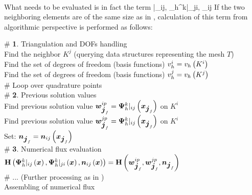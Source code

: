 \paragraph{}
What needs to be evaluated is in fact the term
\be
\mrH{}|_{ij}\lo\bfx\ro, {\mrPsi_h^{k}}|_{ji}\lo\bfx\ro, \bfn_{ij}\lo\bfx\ro\ro
\ee
If the two neighboring elements are of the same size as in , calculation of this term from algorithmic perspective is performed as follows:\\
\begin{algorithm}[H]
\# \textbf{1}. Triangulation and DOFs handling\\
Find the neighbor $K^j$ (querying data structures representing the mesh $T$)\\
Find the set of degrees of freedom (basis functions) $v_h^i = v_h \left( K^i\right)$\\
Find the set of degrees of freedom (basis functions) $v_h^j = v_h \left( K^j\right)$\\

\# Loop over quadrature points\\
{
	\# \textbf{2}. Previous solution values\\
	Find previous solution value $\mbox{\boldmath $w$}_{\mbox{\boldmath $j$}_f}^{ip} = {\mathrm{\mathbf{\Psi}}_h^{k}}|_{ij}\left(\mbox{\boldmath $x$}_{\mbox{\boldmath $j$}_f}\right)$ on $K^i$\\
	Find previous solution value $\mbox{\boldmath $w$}_{\mbox{\boldmath $j$}_f}^{jp} = {\mathrm{\mathbf{\Psi}}_h^{k}}|_{ij}\left(\mbox{\boldmath $x$}_{\mbox{\boldmath $j$}_f}\right)$ on $K^i$\\
	Set: $\mbox{\boldmath $n$}_{\mbox{\boldmath $j$}_f} = \mbox{\boldmath $n$}_{ij}\left(\mbox{\boldmath $x$}_{\mbox{\boldmath $j$}_f}\right)$\\
	\# \textbf{3}. Numerical flux evaluation\\
	$\mathrm{\mathbf{H}}\left({\mathrm{\mathbf{\Psi}}_h^{k}}|_{ij}\left(\mbox{\boldmath $x$}\right), {\mathrm{\mathbf{\Psi}}_h^{k}}|_{ji}\left(\mbox{\boldmath $x$}\right), \mbox{\boldmath $n$}_{ij}\left(\mbox{\boldmath $x$}\right)\right)
		= \mathrm{\mathbf{H}}\left(\mbox{\boldmath $w$}_{\mbox{\boldmath $j$}_f}^{ip}, \mbox{\boldmath $w$}_{\mbox{\boldmath $j$}_f}^{jp}, \mbox{\boldmath $n$}_{\mbox{\boldmath $j$}_f}\right)$\\
		
	\# ... (Further processing as in )
}
\ \\
\caption{Assembling of numerical flux}
\label{algorithm:numFluxSimple}
\end{algorithm}

